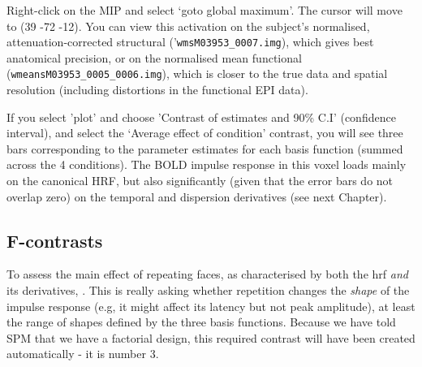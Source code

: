 \documentclass[a4paper,titlepage]{book}
\begin{document}
Right-click on the MIP and select `goto global maximum'. The cursor will move to (39 -72 -12). You can view this activation on the subject's normalised, attenuation-corrected structural ('\verb!wmsM03953_0007.img!), which gives best anatomical precision, or on the normalised mean functional (\verb!wmeansM03953_0005_0006.img!), which is closer to the true data and spatial resolution (including distortions in the functional EPI data). 

If you select 'plot' and choose 'Contrast of estimates and 90\% C.I' (confidence interval), and select the `Average effect of condition' contrast, you will see three bars corresponding to the parameter estimates for each basis function (summed across the 4 conditions). The BOLD impulse response in this voxel loads mainly on the canonical HRF, but also significantly (given that the error bars do not overlap zero) on the temporal and dispersion derivatives (see next Chapter).

\subsection{F-contrasts}

To assess the main effect of repeating faces, as characterised by both the hrf {\em and} its derivatives,    . This is really asking whether repetition changes the {\em shape} of the impulse response (e.g, it might affect its latency but not peak amplitude), at least the range of shapes defined by the three basis functions. Because we have told SPM that we have a factorial design, this required contrast will have been created automatically - it is number 3. 
\end{document}
